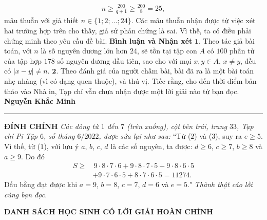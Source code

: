 \begin{multicols}{2}
\begin{align*}
		n \ge \frac{{200}}{{q + 1}} \ge \frac{{200}}{8} = 25,
	\end{align*}
	mâu thuẫn với giả thiết $n \in \{1; 2; \ldots; 24\}$.
	\vskip 0.05cm
	Các mâu thuẫn nhận được từ việc xét hai trường hợp trên cho thấy, giả sử phản chứng là sai. Vì thế, ta có điều phải chứng minh theo yêu cầu đề bài.
	\vskip 0.05cm
	\textbf{\color{thachthuctoanhoc}Bình luận và Nhận xét}
	\vskip 0.05cm
	$\pmb{1.}$ Theo tác giả bài toán, với $n$ là số nguyên dương lớn hơn $24$, sẽ tồn tại tập con $A$ có $100$ phần tử của tập hợp $178$ số nguyên dương đầu tiên, sao cho với mọi $x, y \in A$, $x \ne y$, đều có $|x-y| \ne n$.
	\vskip 0.05cm 
	$\pmb{2.}$ Theo đánh giá của người chấm bài, bài đã ra là một bài toán nhẹ nhàng (vì có dạng quen thuộc), và thú vị. Tiếc rằng, cho đến thời điểm bản thảo vào Nhà in, Tạp chí vẫn chưa nhận được một lời giải nào từ bạn đọc.
	\vskip 0.15cm
	\hfill	\textbf{\color{thachthuctoanhoc}Nguyễn Khắc Minh}
	\vskip 0.15cm
	\rule{1\linewidth}{0.1pt}
	\vskip 0.1cm
	\textbf{\color{thachthuctoanhoc}ĐÍNH CHÍNH}
	\vskip 0.1cm
	\textit{Các dòng từ $1$ đến $7$ (trên xuống), cột bên trái, trang $33$, Tạp chí Pi Tập $6$, số tháng $6/2022$, được sửa lại như sau:}
	\vskip 0.05cm
	``Từ ($2$) và ($3$), suy ra $e \ge 5$. Vì thế, từ ($1$), với lưu ý $a$, $b$, $c$, $d$ là các số nguyên, ta được: $d \ge 6$, $c \ge 7$, $b \ge 8$ và $a \ge 9$. Do đó
	\begin{align*}
		S \ge &\,9 \cdot 8 \cdot 7 \cdot 6 + 9 \cdot 8 \cdot 7 \cdot 5 + 9 \cdot 8 \cdot 6 \cdot 5 \\
		&+ 9 \cdot 7 \cdot 6 \cdot 5 + 8 \cdot 7 \cdot 6 \cdot 5 = 11274.
	\end{align*}
	Dấu bằng đạt được khi $a = 9$, $b = 8$, $c = 7$, $d = 6$ và $e = 5$."
	\vskip 0.05cm
	\textit{Thành thật cáo lỗi cùng bạn đọc.}
\end{multicols}
\begin{center}
	\textbf{\color{thachthuctoanhoc}DANH SÁCH HỌC SINH CÓ LỜI GIẢI HOÀN CHỈNH}
\end{center}
